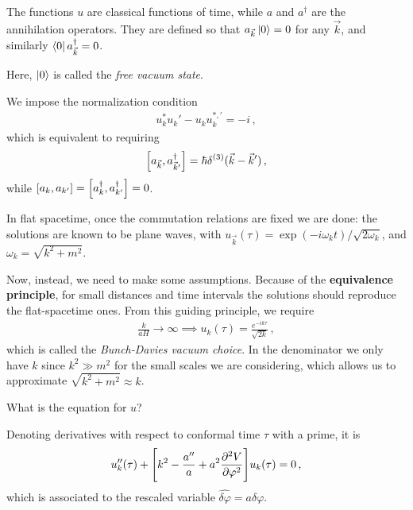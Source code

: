 \documentclass[main.tex]{subfiles}
\begin{document}
The functions \(u\) are classical functions of time, while \(a\) and \(a ^\dag \) are the annihilation operators.
They are defined so that \(a_{\vec{k}} \ket{0} = 0\) for any \(\vec{k}\), and similarly \(\bra{0} a ^\dag_{\vec{k}} = 0\). 

Here, \(\ket{0}\) is called the \emph{free vacuum state}.

We impose the normalization condition 
%
\begin{align}
u_k^{*} u_k' - u_k u_k^{*, \prime} = -i
\,,
\end{align}
%
which is equivalent to requiring 
%
\begin{align}
\qty[a_{\vec{k}}, a_{\vec{k}'} ^\dag] = \hbar \delta^{(3)} (\vec{k} - \vec{k}')
\,,
\end{align}
%
while \(\qty[a_k, a_{k'}] = \qty[a_k ^\dag, a_{k'}^\dag] = 0\). 

In flat spacetime, once the commutation relations are fixed we are done: the solutions are known to be plane waves, with \(u_{\vec{k}}(\tau ) = \exp(- i \omega _k t) / \sqrt{2 \omega _k}\), and \(\omega _k = \sqrt{k^2 + m^2}\). 

Now, instead, we need to make some assumptions. Because of the \textbf{equivalence principle}, for small distances and time intervals the solutions should reproduce the flat-spacetime ones. 
From this guiding principle, we require 
%
\begin{align}
\frac{k}{aH} \to \infty \implies 
u_k (\tau ) = \frac{e^{-i k \tau }}{\sqrt{2 k}}
\,,
\end{align}
%
which is called the \emph{Bunch-Davies vacuum choice}.
In the denominator we only have \(k\) since \(k^2\gg m^2\) for the small scales we are considering, which allows us to approximate \(\sqrt{k^2 + m^2 } \approx k\). 

What is the equation for \(u\)? 
\begin{claim}
Denoting derivatives with respect to conformal time \(\tau \) with a prime, it is 
%
\begin{align}
u''_k (\tau ) + \qty[k^2  - \frac{a''}{a} + a^2 \pdv[2]{V}{\varphi }] u_k (\tau ) = 0
\,,
\end{align}
%
which is associated to the rescaled variable \( \hat{ \delta \varphi} = a \delta \varphi \). 
\end{claim}
\end{document}
